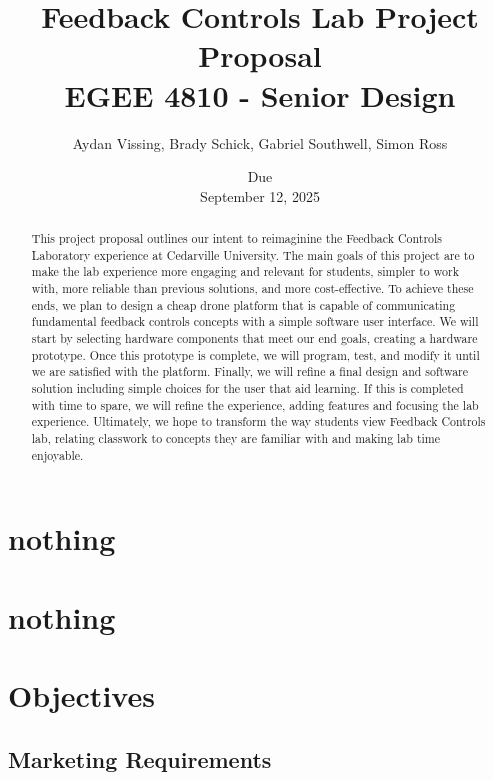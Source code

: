 \documentclass[12pt, titlepage]{article}
\title{Feedback Controls Lab Project Proposal \\ \normalsize{EGEE 4810 - Senior Design}}
\author{Aydan Vissing, Brady Schick, Gabriel Southwell, Simon Ross}
\date{\footnotesize{Due} \\ \normalsize{September 12, 2025}}
\begin{document}
\maketitle


\begin{abstract}
This project proposal outlines our intent to reimaginine the Feedback Controls Laboratory experience at Cedarville University. The main goals of this project are to make the lab experience more engaging and relevant for students, simpler to work with, more reliable than previous solutions, and more cost-effective. To achieve these ends, we plan to design a cheap drone platform that is capable of communicating fundamental feedback controls concepts with a simple software user interface. We will start by selecting hardware components that meet our end goals, creating a hardware prototype. Once this prototype is complete, we will program, test, and modify it until we are satisfied with the platform. Finally, we will refine a final design and software solution including simple choices for the user that aid learning. If this is completed with time to spare, we will refine the experience, adding features and focusing the lab experience. Ultimately, we hope to transform the way students view Feedback Controls lab, relating classwork to concepts they are familiar with and making lab time enjoyable.
\end{abstract}

\newpage
\tableofcontents
\section{nothing}
\section{nothing}
\newpage
\section{Objectives}
\subsection{Marketing Requirements}
\end{document}
